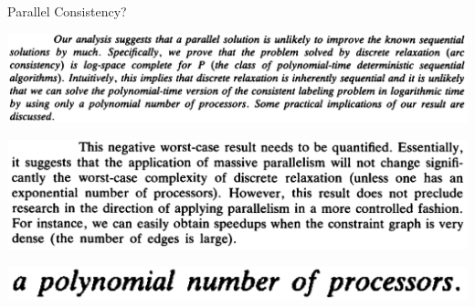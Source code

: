 \documentclass[aspectratio=169,compress,10pt]{beamer}
\begin{document}
\begin{frame}{Parallel Consistency?}
{        \vspace{2em}

        \centering\includegraphics[keepaspectratio=true,scale=0.1]{acpc-abstract.png}

        \vspace{2em}

        \centering\includegraphics[keepaspectratio=true,scale=0.1]{acpc-practical.png}

        \vspace{0em}
    }



     {
        \centering\includegraphics[keepaspectratio=true,scale=0.4]{acpc-poly.png}

        \vspace{0em}
    }
\end{frame}
\end{document}

